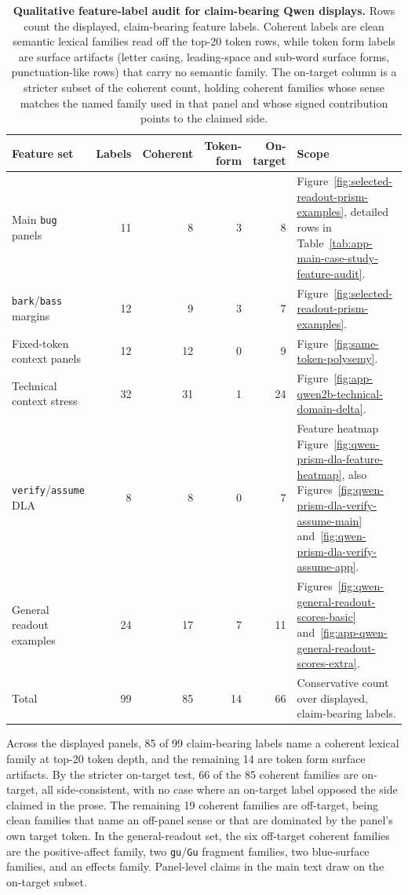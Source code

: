 \begin{table}[!tbp]
\caption{\textbf{Qualitative feature-label audit for claim-bearing Qwen displays.}
Rows count the displayed, claim-bearing feature labels. Coherent
labels are clean semantic lexical families read off the top-20 token rows,
while token form labels are surface artifacts (letter casing, leading-space and
sub-word surface forms, punctuation-like rows) that carry no semantic family.
The on-target column is a stricter subset of the coherent count, holding coherent
families whose sense matches the named family used in that panel and whose
signed contribution points to the claimed side.}
\label{tab:app-qualitative-feature-label-audit}
\centering
\scriptsize
\setlength{\tabcolsep}{3pt}
\renewcommand{\arraystretch}{1.08}
\begin{tabularx}{\textwidth}{@{}lrrrrY@{}}
\toprule
Feature set & Labels & Coherent & Token-form & On-target & Scope \\
\midrule
Main \texttt{bug} panels & 11 & 8 & 3 & 8 & Figure~\ref{fig:selected-readout-prism-examples}, detailed rows in Table~\ref{tab:app-main-case-study-feature-audit}. \\
\texttt{bark}/\texttt{bass} margins & 12 & 9 & 3 & 7 & Figure~\ref{fig:selected-readout-prism-examples}. \\
Fixed-token context panels & 12 & 12 & 0 & 9 & Figure~\ref{fig:same-token-polysemy}. \\
Technical context stress & 32 & 31 & 1 & 24 & Figure~\ref{fig:app-qwen2b-technical-domain-delta}. \\
\texttt{verify}/\texttt{assume} DLA & 8 & 8 & 0 & 7 & Feature heatmap Figure~\ref{fig:qwen-prism-dla-feature-heatmap}, also Figures~\ref{fig:qwen-prism-dla-verify-assume-main} and~\ref{fig:qwen-prism-dla-verify-assume-app}. \\
General readout examples & 24 & 17 & 7 & 11 & Figures~\ref{fig:qwen-general-readout-scores-basic} and~\ref{fig:app-qwen-general-readout-scores-extra}. \\
\midrule
Total & 99 & 85 & 14 & 66 & Conservative count over displayed, claim-bearing labels. \\
\bottomrule
\end{tabularx}
\end{table}

Across the displayed panels, 85 of 99 claim-bearing labels name a coherent
lexical family at top-20 token depth, and the remaining 14 are token form
surface artifacts. By the stricter on-target test, 66 of the 85 coherent
families are on-target, all side-consistent, with no case where an
on-target label opposed the side claimed in the prose. The remaining 19
coherent families are off-target, being clean families that name an off-panel
sense or that are dominated by the panel's own target token. In the
general-readout set, the six off-target coherent families are the
positive-affect family, two \texttt{gu}/\texttt{Gu} fragment families, two
blue-surface families, and an effects family. Panel-level
claims in the main text draw on the on-target subset.

